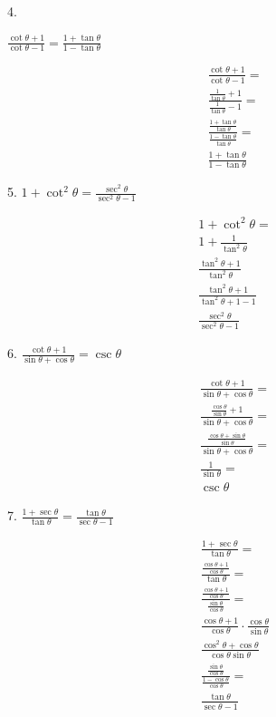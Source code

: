 \documentclass[]{report}
\begin{document}
4.

$\frac{ \cot \theta + 1}{\cot \theta - 1} = \frac{1 + \tan \theta}{1 - \tan \theta}$

\begin{align*}
\frac{ \cot \theta + 1}{\cot \theta - 1} = \\
\frac{ \frac{1}{\tan\theta} + 1}{\frac{1}{\tan \theta} - 1} = \\
\frac{ \frac{1 + \tan \theta}{\tan\theta}}{\frac{1 - \tan \theta}{\tan \theta}}  = \\
\frac{ 1 + \tan \theta}{1 - \tan \theta}  
\end{align*}

5. $1  + \cot^2 \theta = \frac{\sec^2\theta}{\sec^2\theta - 1}$

\begin{align*}
1 + \cot^2 \theta = \\
1 + \frac{1}{\tan^2 \theta}\\
\frac{\tan^2 \theta + 1}{\tan^2 \theta}\\
\frac{\tan^2 \theta + 1}{\tan^2 \theta + 1 - 1}\\
\frac{\sec^2 \theta}{\sec^2 \theta - 1}
\end{align*}

6. $\frac{\cot \theta + 1}{\sin \theta + \cos \theta} = \csc \theta$

\begin{align*}
\frac{\cot \theta + 1}{\sin \theta + \cos \theta} = \\
\frac{\frac{\cos \theta}{\sin \theta} + 1}{\sin \theta + \cos \theta}  = \\
\frac{\frac{\cos \theta + \sin\theta}{\sin \theta}}{\sin \theta + \cos \theta} = \\
\frac{1}{\sin \theta} = \\
\csc \theta
\end{align*}

7. $\frac{1 + \sec \theta}{\tan \theta} = \frac{\tan \theta}{\sec \theta - 1}$

\begin{align*}
\frac{1 + \sec \theta}{\tan \theta} = \\
\frac{\frac{\cos \theta + 1}{\cos \theta}}{\tan \theta} = \\
\frac{\frac{\cos \theta + 1}{\cos \theta}}{\frac{\sin \theta}{\cos \theta}} = \\
\frac{\cos \theta + 1}{\cos \theta}\cdot \frac{\cos \theta}{ \sin \theta} \\
\frac{\cos^2 \theta + \cos \theta}{\cos \theta \sin \theta} \\
\frac{\frac{\sin \theta}{\cos\theta}}{\frac{1 - \cos \theta}{\cos \theta}} = \\
\frac{\tan \theta}{\sec \theta - 1}
\end{align*}
\end{document}
